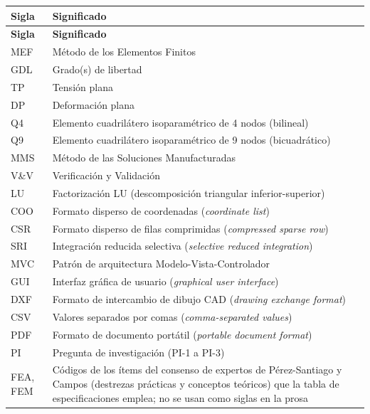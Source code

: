 \begin{longtable}{@{}p{2.4cm}p{11.4cm}@{}}
\toprule
\textbf{Sigla} & \textbf{Significado} \\
\midrule
\endfirsthead
\toprule
\textbf{Sigla} & \textbf{Significado} \\
\midrule
\endhead
\bottomrule
\endfoot
MEF & Método de los Elementos Finitos \\
GDL & Grado(s) de libertad \\
TP & Tensión plana \\
DP & Deformación plana \\
Q4 & Elemento cuadrilátero isoparamétrico de 4 nodos (bilineal) \\
Q9 & Elemento cuadrilátero isoparamétrico de 9 nodos (bicuadrático) \\
MMS & Método de las Soluciones Manufacturadas \\
V\&V & Verificación y Validación \\
LU & Factorización LU (descomposición triangular inferior-superior) \\
COO & Formato disperso de coordenadas (\emph{coordinate list}) \\
CSR & Formato disperso de filas comprimidas (\emph{compressed sparse row}) \\
SRI & Integración reducida selectiva (\emph{selective reduced integration}) \\
MVC & Patrón de arquitectura Modelo-Vista-Controlador \\
GUI & Interfaz gráfica de usuario (\emph{graphical user interface}) \\
DXF & Formato de intercambio de dibujo CAD (\emph{drawing exchange format}) \\
CSV & Valores separados por comas (\emph{comma-separated values}) \\
PDF & Formato de documento portátil (\emph{portable document format}) \\
PI & Pregunta de investigación (PI-1 a PI-3) \\
FEA, FEM & Códigos de los ítems del consenso de expertos de Pérez-Santiago y Campos (destrezas prácticas y conceptos teóricos) que la tabla de especificaciones emplea; no se usan como siglas en la prosa \\
\end{longtable}
\renewcommand{\arraystretch}{1.0}

\setcounter{table}{0}
